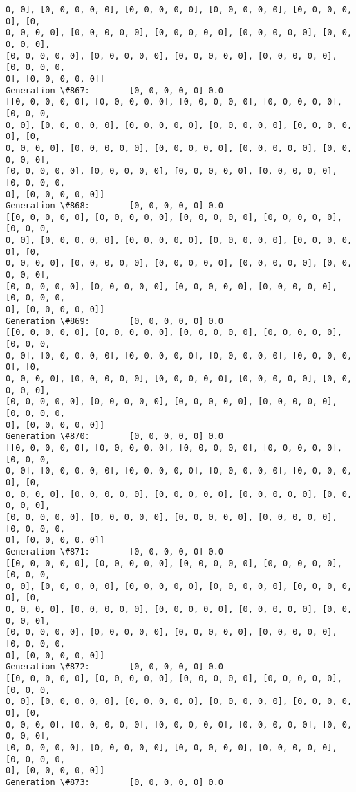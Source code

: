 \documentclass[11pt]{article}
\begin{document}
\begin{Verbatim}[commandchars=\\\{\}]
0, 0], [0, 0, 0, 0, 0], [0, 0, 0, 0, 0], [0, 0, 0, 0, 0], [0, 0, 0, 0, 0], [0,
0, 0, 0, 0], [0, 0, 0, 0, 0], [0, 0, 0, 0, 0], [0, 0, 0, 0, 0], [0, 0, 0, 0, 0],
[0, 0, 0, 0, 0], [0, 0, 0, 0, 0], [0, 0, 0, 0, 0], [0, 0, 0, 0, 0], [0, 0, 0, 0,
0], [0, 0, 0, 0, 0]]
Generation \#867:        [0, 0, 0, 0, 0] 0.0
[[0, 0, 0, 0, 0], [0, 0, 0, 0, 0], [0, 0, 0, 0, 0], [0, 0, 0, 0, 0], [0, 0, 0,
0, 0], [0, 0, 0, 0, 0], [0, 0, 0, 0, 0], [0, 0, 0, 0, 0], [0, 0, 0, 0, 0], [0,
0, 0, 0, 0], [0, 0, 0, 0, 0], [0, 0, 0, 0, 0], [0, 0, 0, 0, 0], [0, 0, 0, 0, 0],
[0, 0, 0, 0, 0], [0, 0, 0, 0, 0], [0, 0, 0, 0, 0], [0, 0, 0, 0, 0], [0, 0, 0, 0,
0], [0, 0, 0, 0, 0]]
Generation \#868:        [0, 0, 0, 0, 0] 0.0
[[0, 0, 0, 0, 0], [0, 0, 0, 0, 0], [0, 0, 0, 0, 0], [0, 0, 0, 0, 0], [0, 0, 0,
0, 0], [0, 0, 0, 0, 0], [0, 0, 0, 0, 0], [0, 0, 0, 0, 0], [0, 0, 0, 0, 0], [0,
0, 0, 0, 0], [0, 0, 0, 0, 0], [0, 0, 0, 0, 0], [0, 0, 0, 0, 0], [0, 0, 0, 0, 0],
[0, 0, 0, 0, 0], [0, 0, 0, 0, 0], [0, 0, 0, 0, 0], [0, 0, 0, 0, 0], [0, 0, 0, 0,
0], [0, 0, 0, 0, 0]]
Generation \#869:        [0, 0, 0, 0, 0] 0.0
[[0, 0, 0, 0, 0], [0, 0, 0, 0, 0], [0, 0, 0, 0, 0], [0, 0, 0, 0, 0], [0, 0, 0,
0, 0], [0, 0, 0, 0, 0], [0, 0, 0, 0, 0], [0, 0, 0, 0, 0], [0, 0, 0, 0, 0], [0,
0, 0, 0, 0], [0, 0, 0, 0, 0], [0, 0, 0, 0, 0], [0, 0, 0, 0, 0], [0, 0, 0, 0, 0],
[0, 0, 0, 0, 0], [0, 0, 0, 0, 0], [0, 0, 0, 0, 0], [0, 0, 0, 0, 0], [0, 0, 0, 0,
0], [0, 0, 0, 0, 0]]
Generation \#870:        [0, 0, 0, 0, 0] 0.0
[[0, 0, 0, 0, 0], [0, 0, 0, 0, 0], [0, 0, 0, 0, 0], [0, 0, 0, 0, 0], [0, 0, 0,
0, 0], [0, 0, 0, 0, 0], [0, 0, 0, 0, 0], [0, 0, 0, 0, 0], [0, 0, 0, 0, 0], [0,
0, 0, 0, 0], [0, 0, 0, 0, 0], [0, 0, 0, 0, 0], [0, 0, 0, 0, 0], [0, 0, 0, 0, 0],
[0, 0, 0, 0, 0], [0, 0, 0, 0, 0], [0, 0, 0, 0, 0], [0, 0, 0, 0, 0], [0, 0, 0, 0,
0], [0, 0, 0, 0, 0]]
Generation \#871:        [0, 0, 0, 0, 0] 0.0
[[0, 0, 0, 0, 0], [0, 0, 0, 0, 0], [0, 0, 0, 0, 0], [0, 0, 0, 0, 0], [0, 0, 0,
0, 0], [0, 0, 0, 0, 0], [0, 0, 0, 0, 0], [0, 0, 0, 0, 0], [0, 0, 0, 0, 0], [0,
0, 0, 0, 0], [0, 0, 0, 0, 0], [0, 0, 0, 0, 0], [0, 0, 0, 0, 0], [0, 0, 0, 0, 0],
[0, 0, 0, 0, 0], [0, 0, 0, 0, 0], [0, 0, 0, 0, 0], [0, 0, 0, 0, 0], [0, 0, 0, 0,
0], [0, 0, 0, 0, 0]]
Generation \#872:        [0, 0, 0, 0, 0] 0.0
[[0, 0, 0, 0, 0], [0, 0, 0, 0, 0], [0, 0, 0, 0, 0], [0, 0, 0, 0, 0], [0, 0, 0,
0, 0], [0, 0, 0, 0, 0], [0, 0, 0, 0, 0], [0, 0, 0, 0, 0], [0, 0, 0, 0, 0], [0,
0, 0, 0, 0], [0, 0, 0, 0, 0], [0, 0, 0, 0, 0], [0, 0, 0, 0, 0], [0, 0, 0, 0, 0],
[0, 0, 0, 0, 0], [0, 0, 0, 0, 0], [0, 0, 0, 0, 0], [0, 0, 0, 0, 0], [0, 0, 0, 0,
0], [0, 0, 0, 0, 0]]
Generation \#873:        [0, 0, 0, 0, 0] 0.0

\end{Verbatim}
\end{document}
